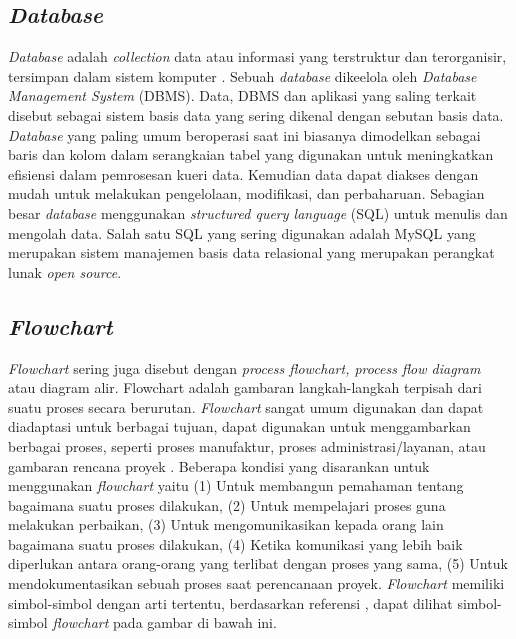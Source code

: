 \begin{flushleft}
\begin{justify}
        \subsection{\textit{Database}}
            \textit{Database} adalah \textit{collection} data atau informasi yang terstruktur dan terorganisir, 
            tersimpan dalam sistem komputer \cite{Database}. Sebuah \textit{database} dikeelola oleh \textit{Database Management System} (DBMS). 
            Data, DBMS dan aplikasi yang saling terkait disebut sebagai sistem basis data yang sering dikenal dengan sebutan basis data.
            \textit{Database} yang paling umum beroperasi saat ini biasanya dimodelkan sebagai baris dan kolom dalam 
            serangkaian tabel yang digunakan untuk meningkatkan efisiensi dalam pemrosesan kueri data. 
            Kemudian data dapat diakses dengan mudah untuk melakukan pengelolaan, modifikasi, dan perbaharuan. 
            Sebagian besar \textit{database} menggunakan \textit{structured query language} (SQL) untuk menulis 
            dan mengolah data. Salah satu SQL yang sering digunakan adalah MySQL yang merupakan sistem 
            manajemen basis data relasional yang merupakan perangkat lunak \textit{open source}.
            \\
        \subsection{\textit{Flowchart}}
            \textit{Flowchart} sering juga disebut dengan \textit{process flowchart, process flow diagram} atau diagram alir. Flowchart adalah gambaran langkah-langkah terpisah dari suatu proses secara berurutan. 
            \textit{Flowchart} sangat umum digunakan dan dapat diadaptasi untuk berbagai tujuan, dapat digunakan untuk menggambarkan berbagai proses, seperti proses manufaktur, proses administrasi/layanan, atau gambaran rencana proyek \cite{Flowchart}.
            Beberapa kondisi yang disarankan untuk menggunakan \textit{flowchart} yaitu 
            (1) Untuk membangun pemahaman tentang bagaimana suatu proses dilakukan,
            (2) Untuk mempelajari proses guna melakukan perbaikan,
            (3) Untuk mengomunikasikan kepada orang lain bagaimana suatu proses dilakukan,
            (4) Ketika komunikasi yang lebih baik diperlukan antara orang-orang yang terlibat dengan proses yang sama,
            (5) Untuk mendokumentasikan sebuah proses saat perencanaan proyek. \textit{Flowchart} memiliki simbol-simbol dengan arti tertentu, berdasarkan referensi \cite{gambar fc}, dapat dilihat simbol-simbol \emph{flowchart} pada gambar di bawah ini.
            \begin{figure}[ht]
                \centering
               

\end{figure}
\end{justify}
\end{flushleft}
